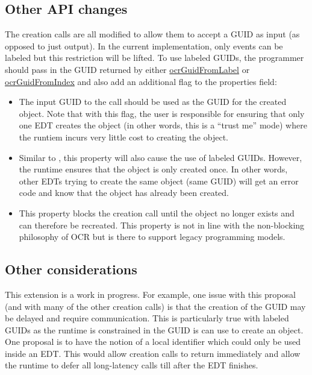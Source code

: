 \subsection{Other API changes}
The creation calls are all modified to allow them to accept a GUID as
input (as opposed to just output). In the current implementation, only
events can be labeled but this restriction will be lifted. To use
labeled GUIDs, the programmer should pass in the GUID returned by
either \hyperlink{func_ocrGuidFromLabel}{ocrGuidFromLabel} or
\hyperlink{func_ocrGuidFromIndex}{ocrGuidFromIndex} and also add an
additional flag to the properties field:
\begin{itemize}
\item {} The input GUID to the call should
  be used as the GUID for the created object. Note that with this
  flag, the user is responsible for ensuring that only one EDT creates
  the object (in other words, this is a ``trust me'' mode) where the
  runtiem incurs very little cost to creating the object.
\item {} Similar to
  , this property will also cause the
  use of labeled GUIDs. However, the runtime ensures that the object
  is only created once. In other words, other EDTs trying to create
  the same object (same GUID) will get an error code and know that the
  object has already been created.
\item {} This property blocks the creation call
  until the object no longer exists and can therefore be
  recreated. This property is not in line with the non-blocking
  philosophy of OCR but is there to support legacy programming models.
\end{itemize}
\subsection{Other considerations}
This extension is a work in progress.
For example,
one issue with this proposal (and with many of the other creation
calls) is that the creation of the GUID may be delayed and require
communication. This is particularly true with labeled GUIDs as the
runtime is constrained in the GUID is can use to create an object. One
proposal is to have the notion of a local identifier which could only
be used inside an EDT. This would allow creation calls to return
immediately and allow the runtime to defer all long-latency calls till
after the EDT finishes.
